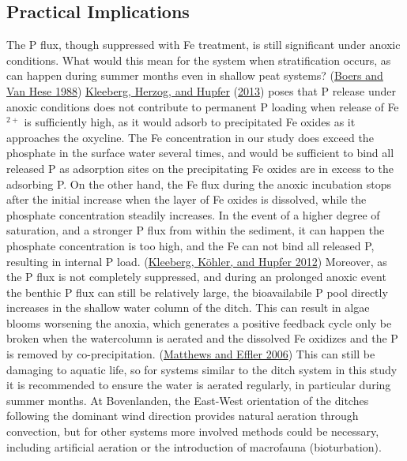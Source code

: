 \documentclass[a4paper,11pt]{article}
\begin{document}
\hypertarget{practical-implications}{%
\subsection{Practical Implications}\label{practical-implications}}

The P flux, though suppressed with Fe treatment, is still significant under anoxic conditions. What would this mean for the system when stratification occurs, as can happen during summer months even in shallow peat systems? (\protect\hyperlink{ref-boersPhosphorusReleasePeaty1988}{Boers and Van Hese 1988}) \protect\hyperlink{ref-kleebergRedoxSensitivityIron2013}{Kleeberg, Herzog, and Hupfer} (\protect\hyperlink{ref-kleebergRedoxSensitivityIron2013}{2013}) poses that P release under anoxic conditions does not contribute to permanent P loading when release of Fe\(^{2+}\) is sufficiently high, as it would adsorb to precipitated Fe oxides as it approaches the oxycline. The Fe concentration in our study does exceed the phosphate in the surface water several times, and would be sufficient to bind all released P as adsorption sites on the precipitating Fe oxides are in excess to the adsorbing P. On the other hand, the Fe flux during the anoxic incubation stops after the initial increase when the layer of Fe oxides is dissolved, while the phosphate concentration steadily increases. In the event of a higher degree of saturation, and a stronger P flux from within the sediment, it can happen the phosphate concentration is too high, and the Fe can not bind all released P, resulting in internal P load. (\protect\hyperlink{ref-kleebergHowEffectivelyDoes2012}{Kleeberg, Köhler, and Hupfer 2012}) Moreover, as the P flux is not completely suppressed, and during an prolonged anoxic event the benthic P flux can still be relatively large, the bioavailabile P pool directly increases in the shallow water column of the ditch. This can result in algae blooms worsening the anoxia, which generates a positive feedback cycle only be broken when the watercolumn is aerated and the dissolved Fe oxidizes and the P is removed by co-precipitation. (\protect\hyperlink{ref-matthewsLongTermChanges2006}{Matthews and Effler 2006}) This can still be damaging to aquatic life, so for systems similar to the ditch system in this study it is recommended to ensure the water is aerated regularly, in particular during summer months. At Bovenlanden, the East-West orientation of the ditches following the dominant wind direction provides natural aeration through convection, but for other systems more involved methods could be necessary, including artificial aeration or the introduction of macrofauna (bioturbation).
\end{document}
